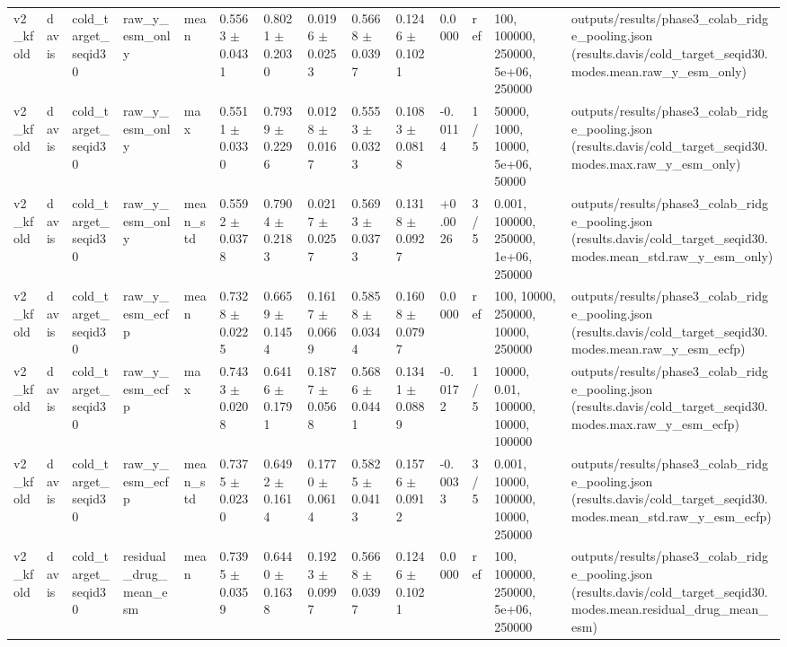 \begin{table}[htbp]
\begin{tabular}{llllllllllllll}
v2\_kfold & davis & cold\_target\_seqid30 & raw\_y\_esm\_only & mean & 0.5563 $\pm$ 0.0431 & 0.8021 $\pm$ 0.2030 & 0.0196 $\pm$ 0.0253 & 0.5668 $\pm$ 0.0397 & 0.1246 $\pm$ 0.1021 & 0.0000 & ref & 100, 100000, 250000, 5e+06, 250000 & outputs/results/phase3\_colab\_ridge\_pooling.json (results.davis/cold\_target\_seqid30.modes.mean.raw\_y\_esm\_only) \\
v2\_kfold & davis & cold\_target\_seqid30 & raw\_y\_esm\_only & max & 0.5511 $\pm$ 0.0330 & 0.7939 $\pm$ 0.2296 & 0.0128 $\pm$ 0.0167 & 0.5553 $\pm$ 0.0323 & 0.1083 $\pm$ 0.0818 & -0.0114 & 1/5 & 50000, 1000, 10000, 5e+06, 50000 & outputs/results/phase3\_colab\_ridge\_pooling.json (results.davis/cold\_target\_seqid30.modes.max.raw\_y\_esm\_only) \\
v2\_kfold & davis & cold\_target\_seqid30 & raw\_y\_esm\_only & mean\_std & 0.5592 $\pm$ 0.0378 & 0.7904 $\pm$ 0.2183 & 0.0217 $\pm$ 0.0257 & 0.5693 $\pm$ 0.0373 & 0.1318 $\pm$ 0.0927 & +0.0026 & 3/5 & 0.001, 100000, 250000, 1e+06, 250000 & outputs/results/phase3\_colab\_ridge\_pooling.json (results.davis/cold\_target\_seqid30.modes.mean\_std.raw\_y\_esm\_only) \\
v2\_kfold & davis & cold\_target\_seqid30 & raw\_y\_esm\_ecfp & mean & 0.7328 $\pm$ 0.0225 & 0.6659 $\pm$ 0.1454 & 0.1617 $\pm$ 0.0669 & 0.5858 $\pm$ 0.0344 & 0.1608 $\pm$ 0.0797 & 0.0000 & ref & 100, 10000, 250000, 10000, 250000 & outputs/results/phase3\_colab\_ridge\_pooling.json (results.davis/cold\_target\_seqid30.modes.mean.raw\_y\_esm\_ecfp) \\
v2\_kfold & davis & cold\_target\_seqid30 & raw\_y\_esm\_ecfp & max & 0.7433 $\pm$ 0.0208 & 0.6416 $\pm$ 0.1791 & 0.1877 $\pm$ 0.0568 & 0.5686 $\pm$ 0.0441 & 0.1341 $\pm$ 0.0889 & -0.0172 & 1/5 & 10000, 0.01, 100000, 10000, 100000 & outputs/results/phase3\_colab\_ridge\_pooling.json (results.davis/cold\_target\_seqid30.modes.max.raw\_y\_esm\_ecfp) \\
v2\_kfold & davis & cold\_target\_seqid30 & raw\_y\_esm\_ecfp & mean\_std & 0.7375 $\pm$ 0.0230 & 0.6492 $\pm$ 0.1614 & 0.1770 $\pm$ 0.0614 & 0.5825 $\pm$ 0.0413 & 0.1576 $\pm$ 0.0912 & -0.0033 & 3/5 & 0.001, 10000, 100000, 10000, 250000 & outputs/results/phase3\_colab\_ridge\_pooling.json (results.davis/cold\_target\_seqid30.modes.mean\_std.raw\_y\_esm\_ecfp) \\
v2\_kfold & davis & cold\_target\_seqid30 & residual\_drug\_mean\_esm & mean & 0.7395 $\pm$ 0.0359 & 0.6440 $\pm$ 0.1638 & 0.1923 $\pm$ 0.0997 & 0.5668 $\pm$ 0.0397 & 0.1246 $\pm$ 0.1021 & 0.0000 & ref & 100, 100000, 250000, 5e+06, 250000 & outputs/results/phase3\_colab\_ridge\_pooling.json (results.davis/cold\_target\_seqid30.modes.mean.residual\_drug\_mean\_esm) \\

\end{tabular}
\end{table}
